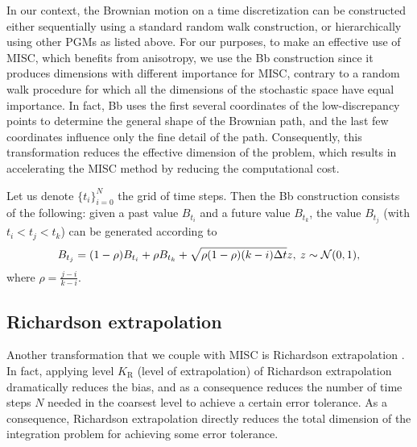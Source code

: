 In our context, the Brownian motion on a time discretization  can be constructed either sequentially using a standard random walk construction, or hierarchically using   other PGMs as listed above. For our purposes, to make an effective use of MISC, which benefits from anisotropy, we use the Bb construction since it produces  dimensions with different importance for MISC, contrary to a random walk procedure for which all the dimensions of the stochastic space have equal importance. In fact, Bb uses the first several coordinates of the low-discrepancy points to determine the general shape of the Brownian path, and the last few coordinates influence only the fine detail of the path. Consequently, this transformation  reduces the effective dimension  of the problem, which results in accelerating the MISC method by reducing the computational cost.

Let us denote $\{t_i\}_{i=0}^{N}$ the grid of time steps. Then the Bb construction \cite{glasserman2004monte} consists of the following: given a past value $B_{t_i}$ and a future value $B_{t_k}$, the value $B_{t_j}$ (with $t_i < t_j < t_k$) can be generated according to 
\begin{equation*}
B_{t_j}=(1-\rho) B_{t_i}+\rho B_{t_k}+ \sqrt{\rho (1-\rho)(k-i) \Delta t} z, \: z \sim \mathcal{N}(0,1) ,
\end{equation*}
where $\rho=\frac{j-i}{k-i}$.  

\subsection{Richardson extrapolation}\label{sec:Richardson extrapolation}
Another transformation that we couple with MISC is Richardson extrapolation \cite{talay1990expansion}. In fact, applying level $K_\text{R}$ (level of extrapolation) of Richardson extrapolation  dramatically reduces the bias, and as a consequence reduces the  number of time steps $N$ needed in the coarsest level to achieve a certain error tolerance. As a consequence, Richardson extrapolation directly reduces  the total dimension of the integration problem for achieving some error tolerance.

